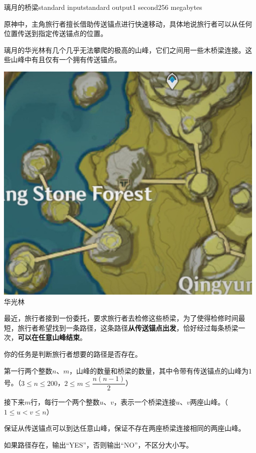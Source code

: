 \begin{problem}{璃月的桥梁}{standard input}{standard output}{1 second}{256 megabytes}

原神中，主角旅行者擅长借助传送锚点进行快速移动，具体地说旅行者可以从任何位置传送到指定传送锚点的位置。

璃月的华光林有几个几乎无法攀爬的极高的山峰，它们之间用一些木桥梁连接。这些山峰中有且仅有一个拥有传送锚点。

\begin{center}
  \includegraphics[scale=0.8]{path.jpg} \\
  \small{华光林}
\end{center}

最近，旅行者接到一份委托，要求旅行者去检修这些桥梁，为了使得检修时间最短，旅行者希望找到一条路径，这条路径\textbf{从传送锚点出发}，恰好经过每条桥梁一次，\textbf{可以在任意山峰结束}。

你的任务是判断旅行者想要的路径是否存在。

\InputFile
第一行两个整数$n$、$m$，山峰的数量和桥梁的数量，其中令带有传送锚点的山峰为$1$号。（$3 \le n \le 200$，$2 \le m \le \dfrac{n(n - 1)}{2}$）

接下来$m$行，每行一个两个整数$u$、$v$，表示一个桥梁连接$u$、$v$两座山峰。（$1 \le u < v \le n$）

保证从传送锚点可以到达任意山峰，保证不存在两座桥梁连接相同的两座山峰。

\OutputFile
如果路径存在，输出``YES''，否则输出``NO''，不区分大小写。

\Examples

\begin{example}
%
%
%
\end{example}

\end{problem}

